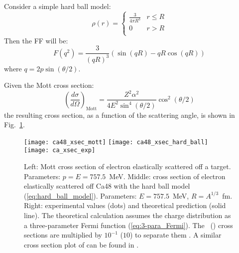 Consider a simple hard ball model:
\begin{equation}
    \rho(r) = 
    \begin{cases}
	\frac{3}{4\pi R^3}  & r \le R	\\
	0		    & r > R   \\
    \end{cases}
    \label{eq:hard_ball_model}
\end{equation}
Then the FF will be:
\begin{equation}
    F(q^2) = \frac{3}{(qR)^3} \left( \sin(qR) - qR\cos(qR) \right)
\end{equation}
where $q = 2p\sin(\theta/2)$.

Given the Mott cross section: %
\begin{equation}
    \left( \frac{d\sigma}{d\Omega} \right)_{\text{Mott}} = 
	\frac{Z^2 \alpha^2}{4E^2\sin^4(\theta/2)}\cos^2(\theta/2)   
\end{equation}
the resulting cross section, as a function of the scattering angle, is shown in Fig.~\ref{fig:ca_xsec}.
\begin{figure}
    \texttt{[image: ca48\_xsec\_mott]}
    \texttt{[image: ca48\_xsec\_hard\_ball]}
    \texttt{[image: ca\_xsec\_exp]}
    \caption[xsection of \Ca]{Left: Mott cross section of electron elastically scattered off a \Ca
    target. Parameters: $p=E=757.5$~MeV.
    Middle: cross section of electron elastically scattered off Ca48 with the hard ball
    model (\ref{eq:hard_ball_model}). Parameters: $E =  757.5$~MeV, $R=A^{1/3}$~fm. 
    Right: experimental values (dots) and theoretical prediction (solid line).
    The theoretical calculation assumes the charge distribution as a three-parameter Fermi function (\ref{eq:3-para_Fermi}).
    The \Ca \ (\ca) cross sections are multiplied by $10^{-1}$ ($10$) to separate them
    \cite{PhysRevLett.19.527}. A similar cross section plot of \Pb can be found
    in \cite{PhysRevLett.38.152}.
    }
    \label{fig:ca_xsec}
\end{figure}

